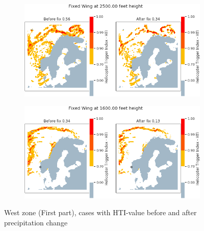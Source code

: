 \begin{figure}[H]
    \begin{subfigure}{0.45\textwidth}
    \centering
    \includegraphics[width=\textwidth]{Figures/14.png}
    \caption{}
    \label{fig:HTI14}
    \end{subfigure}
\hfill
    \begin{subfigure}{0.45\textwidth}
    \centering
    \includegraphics[width=\textwidth]{Figures/15.png}
    \caption{}
    \label{fig:HTI15}
    \end{subfigure}
\caption{West zone (First part), cases with HTI-value before and after precipitation change}
\end{figure}

